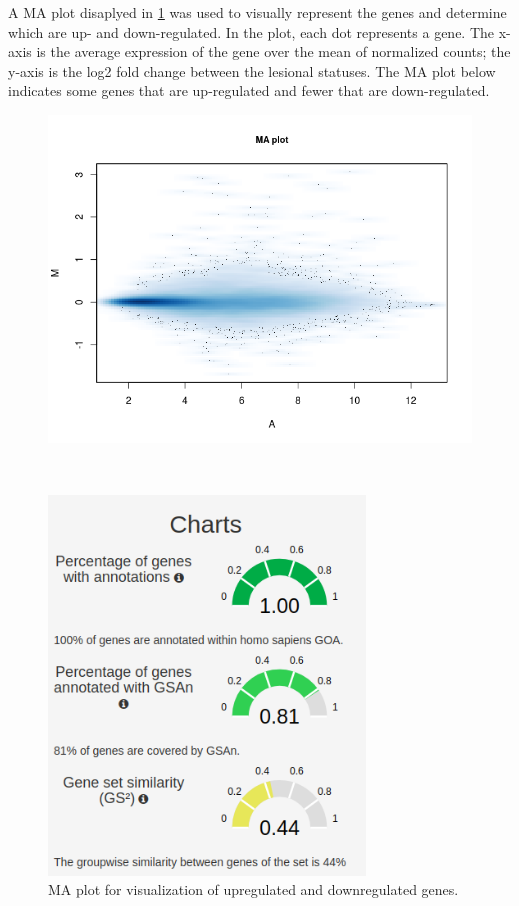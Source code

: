 \documentclass[journal, a4paper]{IEEEtran}
\begin{document}
A MA plot disaplyed in \ref{fig:MA} was used to visually represent the genes and determine which are up- and down-regulated. In the plot, each dot represents a gene. The x-axis is the average expression of the gene over the mean of normalized counts; the y-axis is the log2 fold change between the lesional statuses. The MA plot below indicates some genes that are up-regulated and fewer that are down-regulated.\\

\begin{figure}[!htp]
  \begin{center}
    \begin{minipage}{0.5 \textwidth}
      \centering
      \includegraphics[width=\textwidth]{../analysis/MA-plot-AD-paired-design.png}
      \caption{MA plot for visualization of upregulated and downregulated genes.}
      \label{fig:MA}
    \end{minipage}\\
    \begin{minipage}{0.5 \textwidth}
      \centering
      \includegraphics[width=0.75\textwidth]{gsan-charts.png}

\end{minipage}
\end{center}
\end{figure}
\end{document}
